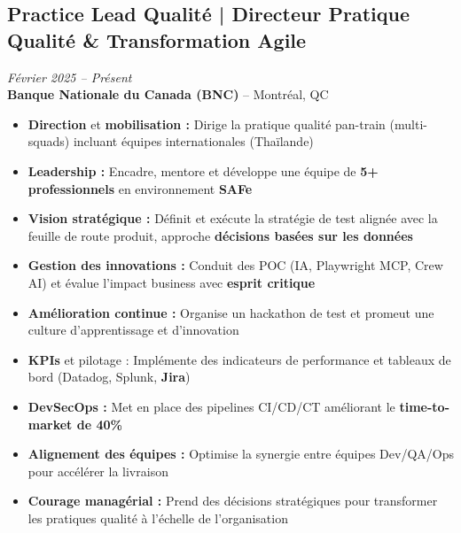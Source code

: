 \documentclass[11pt,a4paper]{article}
\newcommand{\highlight}[1]{\textcolor{primaryblue}{\textbf{#1}}}
\newcommand{\keypoint}[1]{\textbf{#1}}
\begin{document}
\subsection*{Practice Lead Qualité | Directeur Pratique Qualité \& Transformation Agile} \hfill \textit{\color{mediumgray}Février 2025 -- Présent}\\
\textcolor{primaryblue}{\textbf{Banque Nationale du Canada (BNC)}} -- Montréal, QC
\begin{itemize}[leftmargin=22pt]
    \item \highlight{Direction} et \highlight{mobilisation :} Dirige la pratique qualité pan-train (multi-squads) incluant équipes internationales (Thaïlande)
    \item \highlight{Leadership :} Encadre, mentore et développe une équipe de \keypoint{5+ professionnels} en environnement \highlight{SAFe}
    \item \highlight{Vision stratégique :} Définit et exécute la stratégie de test alignée avec la feuille de route produit, approche \highlight{décisions basées sur les données}
    \item \highlight{Gestion des innovations :} Conduit des POC (IA, Playwright MCP, Crew AI) et évalue l'impact business avec \highlight{esprit critique}
    \item \highlight{Amélioration continue :} Organise un hackathon de test et promeut une culture d'apprentissage et d'innovation
    \item \highlight{KPIs} et pilotage : Implémente des indicateurs de performance et tableaux de bord (Datadog, Splunk, \highlight{Jira})
    \item \highlight{DevSecOps :} Met en place des pipelines CI/CD/CT améliorant le \keypoint{time-to-market de 40\%}
    \item \highlight{Alignement des équipes :} Optimise la synergie entre équipes Dev/QA/Ops pour accélérer la livraison
    \item \highlight{Courage managérial :} Prend des décisions stratégiques pour transformer les pratiques qualité à l'échelle de l'organisation
\end{itemize}
\end{document}
